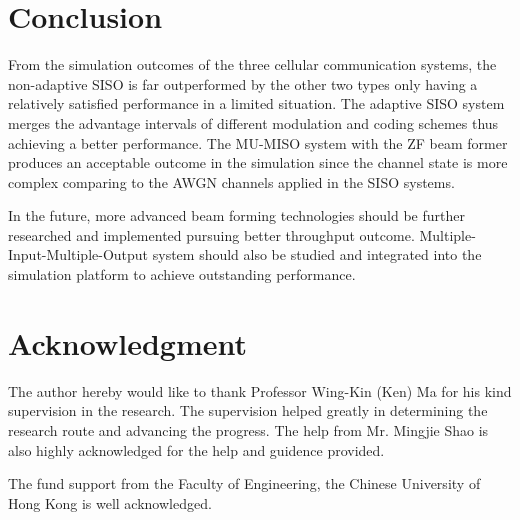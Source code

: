 \documentclass[journal,comsoc]{IEEEtran}
\begin{document}
\section{Conclusion}
From the simulation outcomes of the three cellular communication systems, the non-adaptive SISO is far outperformed by the other two types only having a relatively satisfied performance in a limited situation. The adaptive SISO system merges the advantage intervals of different modulation and coding schemes thus achieving a better performance. The MU-MISO system with the ZF beam former produces an acceptable outcome in the simulation since the channel state is more complex comparing to the AWGN channels applied in the SISO systems.

In the future, more advanced beam forming technologies should be further researched and implemented pursuing better throughput outcome. Multiple-Input-Multiple-Output system should also be studied and integrated into the simulation platform to achieve outstanding performance.

\section*{Acknowledgment}


The author hereby would like to thank Professor Wing-Kin (Ken) Ma for his kind supervision in the research. The supervision helped greatly in determining the research route and advancing the progress.
The help from Mr. Mingjie Shao is also highly acknowledged for the help and guidence provided.

The fund support from the Faculty of Engineering, the Chinese University of Hong Kong is well acknowledged.


\ifCLASSOPTIONcaptionsoff
  \newpage
\fi



\end{document}
